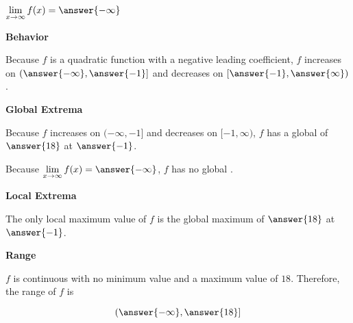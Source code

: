 \documentclass{ximera}
\begin{document}
\begin{exercise}
\begin{question}
$\lim\limits_{x \to \infty} f(x) = \answer{-\infty}$ \\

\end{question}




\begin{question}  \textbf{\textcolor{blue!55!black}{Behavior}}



Because $f$ is a quadratic function with a negative leading coefficient, $f$ increases on $\left( \answer{-\infty}, \answer{-1} \right]$ and decreases on $\left[ \answer{-1}, \answer{\infty} \right)$. 

\end{question}









\begin{question}  \textbf{\textcolor{blue!55!black}{Global Extrema}}

Because $f$ increases on $( -\infty, -1 ]$ and decreases on $[ -1, \infty )$, $f$ has a global   of $\answer{18}$ at $\answer{-1}$.



Because $\lim\limits_{x \to \infty} f(x) = \answer{-\infty}$, $f$ has no global .

\end{question}












\begin{question}  \textbf{\textcolor{blue!55!black}{Local Extrema}}

The only local maximum value of $f$ is the global maximum of $\answer{18}$ at $\answer{-1}$.

\end{question}







\begin{question}  \textbf{\textcolor{blue!55!black}{Range}}

$f$ is continuous with no minimum value and a maximum value of $18$.  Therefore, the range of $f$ is

\[
( \answer{-\infty}, \answer{18} ]
\]

\end{question}


\end{exercise}
\end{document}
